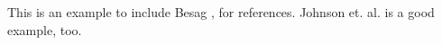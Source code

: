 \documentclass[a4, 12pt]{article}
\begin{document}
\nocite{besag74, lehman86, johnson87, besag89}
\thispagestyle{empty}
	
This is an example to include Besag \cite{besag74}, \cite{lehman86} for references. Johnson et. al. \cite{johnson87} is a good example, too.
	


\end{document}

